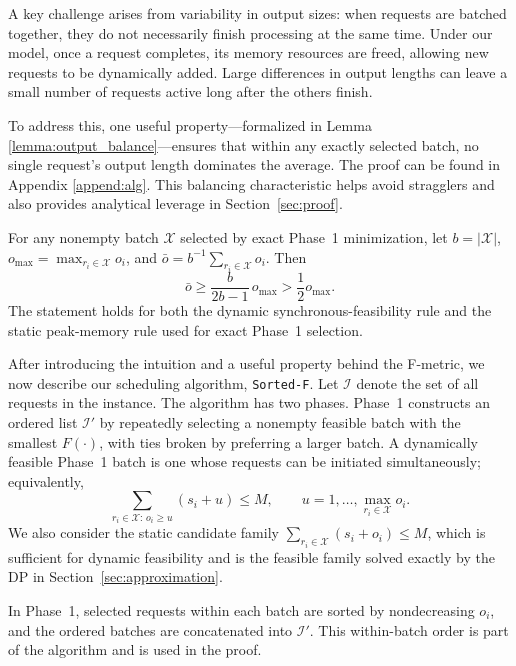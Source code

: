 \documentclass[nonblindrev]{informs3_hide}
\newcommand{\sortF}{\texttt{Sorted-F}}
\begin{document}
A key challenge arises from variability in output sizes: when requests are batched together, they do not necessarily finish processing at the same time. Under our model, once a request completes, its memory resources are freed, allowing new requests to be dynamically added. Large differences in output lengths can leave a small number of requests active long after the others finish.

To address this, one useful property---formalized in Lemma \ref{lemma:output_balance}---ensures that within any exactly selected batch, no single request's output length dominates the average. The proof can be found in Appendix \ref{append:alg}. This balancing characteristic helps avoid stragglers and also provides analytical leverage in Section~\ref{sec:proof}.

\begin{lemma} \label{lemma:output_balance}
For any nonempty batch $\mathcal{X}$ selected by exact Phase~1 minimization, let $b=|\mathcal{X}|$, $o_{\max}=\max_{r_i\in\mathcal{X}}o_i$, and $\bar{o}=b^{-1}\sum_{r_i\in\mathcal{X}}o_i$. Then
\begin{equation}
    \bar{o}\ge \frac{b}{2b-1}\,o_{\max}>\frac12o_{\max}.
\end{equation}
The statement holds for both the dynamic synchronous-feasibility rule and the static peak-memory rule used for exact Phase~1 selection.
\end{lemma}

After introducing the intuition and a useful property behind the F-metric, we now describe our scheduling algorithm, \sortF. Let $\mathcal{I}$ denote the set of all requests in the instance. The algorithm has two phases. Phase~1 constructs an ordered list $\mathcal{I}'$ by repeatedly selecting a nonempty feasible batch with the smallest $F(\cdot)$, with ties broken by preferring a larger batch. A dynamically feasible Phase~1 batch is one whose requests can be initiated simultaneously; equivalently,
\begin{equation}
    \sum_{r_i\in\mathcal{X}:\,o_i\ge u}(s_i+u)\le M,
    \qquad u=1,\ldots,\max_{r_i\in\mathcal{X}}o_i.
\end{equation}
We also consider the static candidate family $\sum_{r_i\in\mathcal{X}}(s_i+o_i)\le M$, which is sufficient for dynamic feasibility and is the feasible family solved exactly by the DP in Section~\ref{sec:approximation}.

In Phase~1, selected requests within each batch are sorted by nondecreasing $o_i$, and the ordered batches are concatenated into $\mathcal I'$. This within-batch order is part of the algorithm and is used in the proof.
\end{document}

